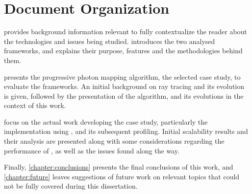 \documentclass[main.tex]{subfiles}
\begin{document}
\section{Document Organization}

 provides background information relevant to fully contextualize the reader about the technologies and issues being studied.  introduces the two analysed frameworks, and explains their purpose, features and the methodologies behind them.

 presents the progressive photon mapping algorithm, the selected case study, to evaluate the frameworks. An initial background on ray tracing and its evolution is given, followed by the presentation of the algorithm, and its evolutions in the context of this work.

 focus on the actual work developing the case study, particularly the implementation using \starpu, and its subsequent profiling. Initial scalability results and their analysis are presented along with some considerations regarding the performance of \starpu, as well as the issues found along the way.

Finally, \cref{chapter:conclusions} presents the final conclusions of this work, and \cref{chapter:future} leaves suggestions of future work on relevant topics that could not be fully covered during this dissertation.
\end{document}
